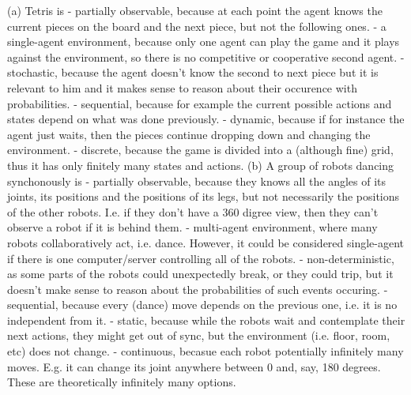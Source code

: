 \documentclass[12pt]{article}
\begin{document}
(a) Tetris is\newline
- partially observable, because at each point the agent knows the current pieces on the board and the next piece, but not the following ones.\newline
- a single-agent environment, because only one agent can play the game and it plays against the environment, so there is no competitive or cooperative second agent.\newline
- stochastic, because the agent doesn't know the second to next piece but it is relevant to him and it makes sense to reason about their occurence with probabilities.\newline
- sequential, because for example the current possible actions and states depend on what was done previously.\newline
- dynamic, because if for instance the agent just waits, then the pieces continue dropping down and changing the environment.\newline
- discrete, because the game is divided into a (although fine) grid, thus it has only finitely many states and actions.
\newpage
(b) A group of robots dancing synchonously is \newline
- partially observable, because they knows all the angles of its joints, its positions and the positions of its legs, but not necessarily the positions of the other robots. I.e. if they don't have a 360 digree view, then they can't observe a robot if it is behind them.\newline 
- multi-agent environment, where many robots collaboratively act, i.e. dance. However, it could be considered single-agent if there is one computer/server controlling all of the robots.\newline
- non-deterministic, as some parts of the robots could unexpectedly break, or they could trip, but it doesn't make sense to reason about the probabilities of such events occuring.\newline
- sequential, because every (dance) move depends on the previous one, i.e. it is no independent from it.\newline
- static, because while the robots wait and contemplate their next actions, they might get out of sync, but the environment (i.e. floor, room, etc) does not change.\newline
- continuous, becasue each robot potentially infinitely many moves. E.g. it can change its joint anywhere between 0 and, say, 180 degrees. These are theoretically infinitely many options.
\end{document}
